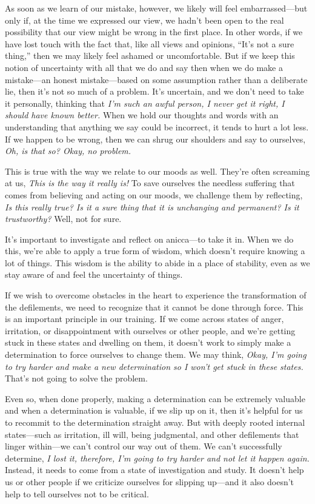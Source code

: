 As soon as we learn of our mistake, however, we likely will feel 
embarrassed---but only if, at the time we expressed our view, we hadn't 
been open to the real possibility that our view might be wrong in the 
first place. In other words, if we have lost touch with the fact that, 
like all views and opinions, ``It's not a sure thing,'' then we may 
likely feel ashamed or uncomfortable. But if we keep this notion of 
uncertainty with all that we do and say then when we do make a 
mistake---an honest mistake---based on some assumption rather than a 
deliberate lie, then it's not so much of a problem. It's uncertain, and 
we don't need to take it personally, thinking that \emph{I'm such an 
awful person, I never get it right, I should have known better.} When 
we hold our thoughts and words with an understanding that anything we 
say could be incorrect, it tends to hurt a lot less. If we happen to be 
wrong, then we can shrug our shoulders and say to ourselves, \emph{Oh, 
is that so? Okay, no problem.}

This is true with the way we relate to our moods as well. They're often 
screaming at us, \emph{This is the way it really is!} To save ourselves 
the needless suffering that comes from believing and acting on our 
moods, we challenge them by reflecting, \emph{Is this really true? Is 
it a sure thing that it is unchanging and permanent? Is it 
trustworthy?} Well, not for sure.

It's important to investigate and reflect on anicca---to take it in. 
When we do this, we're able to apply a true form of wisdom, which 
doesn't require knowing a lot of things. This wisdom is the ability to 
abide in a place of stability, even as we stay aware of and feel the 
uncertainty of things.


If we wish to overcome obstacles in the heart to experience the 
transformation of the defilements, we need to recognize that it cannot 
be done through force. This is an important principle in our training. 
If we come across states of anger, irritation, or disappointment with 
ourselves or other people, and we're getting stuck in these states and 
dwelling on them, it doesn't work to simply make a determination to 
force ourselves to change them. We may think, \emph{Okay, I'm going to 
try harder and make a new determination so I won't get stuck in these 
states.} That's not going to solve the problem.

Even so, when done properly, making a determination can be extremely 
valuable and when a determination is valuable, if we slip up on it, 
then it's helpful for us to recommit to the determination straight 
away. But with deeply rooted internal states---such as irritation, ill 
will, being judgmental, and other defilements that linger within---we 
can't control our way out of them. We can't successfully determine, 
\emph{I lost it, therefore, I'm going to try harder and not let it 
happen again.} Instead, it needs to come from a state of investigation 
and study. It doesn't help us or other people if we criticize ourselves 
for slipping up---and it also doesn't help to tell ourselves not to be 
critical.

